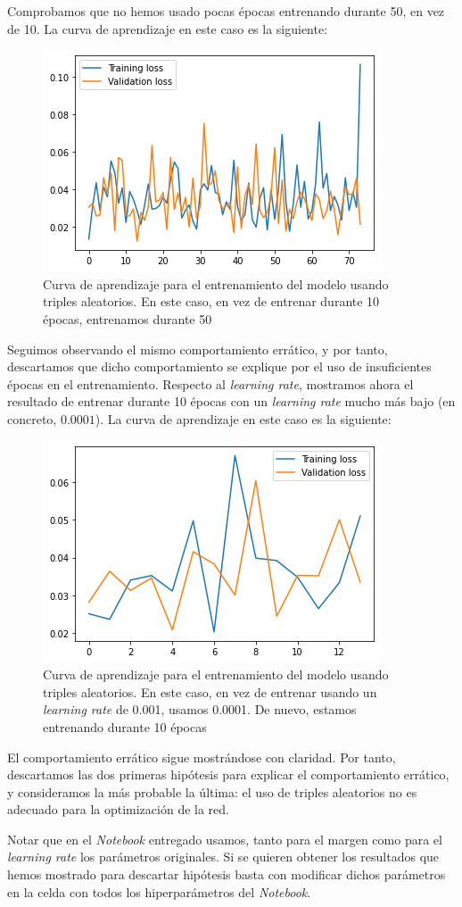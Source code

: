 \documentclass[11pt]{article}
\begin{document}
Comprobamos que no hemos usado pocas épocas entrenando durante 50, en vez de 10. La curva de aprendizaje en este caso es la siguiente:

\begin{figure}[H]
    \centering
    \includegraphics[width = 0.4 \textwidth]{random_curva_aprendizaje_larga}
    \caption{Curva de aprendizaje para el entrenamiento del modelo usando triples aleatorios. En este caso, en vez de entrenar durante 10 épocas, entrenamos durante 50}
\end{figure}

Seguimos observando el mismo comportamiento errático, y por tanto, descartamos que dicho comportamiento se explique por el uso de insuficientes épocas en el entrenamiento. Respecto al \emph{learning rate}, mostramos ahora el resultado de entrenar durante 10 épocas con un \emph{learning rate} mucho más bajo (en concreto, $0.0001$). La curva de aprendizaje en este caso es la siguiente:

\begin{figure}[H]
    \centering
    \includegraphics[width = 0.4 \textwidth]{random_curva_aprendizaje_lrbajo}
    \caption{Curva de aprendizaje para el entrenamiento del modelo usando triples aleatorios. En este caso, en vez de entrenar usando un \emph{learning rate} de 0.001, usamos 0.0001. De nuevo, estamos entrenando durante 10 épocas}
\end{figure}

El comportamiento errático sigue mostrándose con claridad. Por tanto, descartamos las dos primeras hipótesis para explicar el comportamiento errático, y consideramos la más probable la última: el uso de triples aleatorios no es adecuado para la optimización de la red.

Notar que en el \emph{Notebook} entregado usamos, tanto para el margen como para el \emph{learning rate} los parámetros originales. Si se quieren obtener los resultados que hemos mostrado para descartar hipótesis basta con modificar dichos parámetros en la celda con todos los hiperparámetros del \emph{Notebook}.
\end{document}

